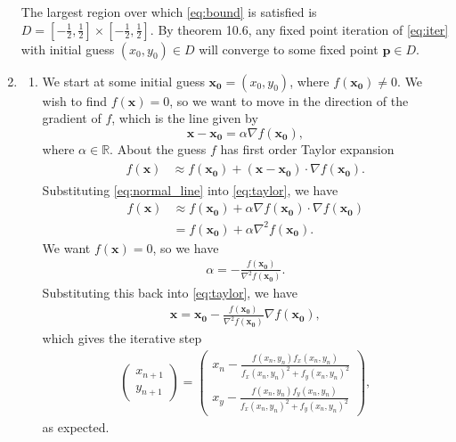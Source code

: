 \documentclass[10pt]{article}
\renewcommand{\vec}{\mathbf}
\begin{document}
\begin{enumerate}
    The largest region over which \eqref{eq:bound} is satisfied is \(D = [-\frac{1}{2}, \frac{1}{2}] \times [-\frac{1}{2}, \frac{1}{2}]\). By theorem 10.6, any fixed point iteration of \eqref{eq:iter} with initial guess \((x_0, y_0) \in D\) will converge to some fixed point \(\mathbf{p} \in D\).

    \newpage

    \item \begin{enumerate}
      \item We start at some initial guess \(\vec{x_0} = (x_0, y_0)\), where \(f(\vec{x_0}) \neq 0\). We wish to find \(f(\vec{x}) = 0\), so we want to move in the direction of the gradient of \(f\), which is the line given by \begin{equation}\label{eq:normal_line}
        \vec{x}-\vec{x_0} = \alpha \nabla f(\vec{x_0}),
      \end{equation} where \(\alpha \in \mathbb{R}\).
      About the guess \(f\) has first order Taylor expansion \begin{align}\label{eq:taylor}
        \begin{split}
          f(\vec{x}) &\approx f(\vec{x_0}) + (\vec{x}-\vec{x_0})\cdot \nabla f(\vec{x_0}).
        \end{split}
      \end{align} Substituting \eqref{eq:normal_line} into \eqref{eq:taylor}, we have \begin{align*}
          f(\vec{x}) &\approx f(\vec{x_0}) + \alpha \nabla f(\vec{x_0}) \cdot  \nabla f(\vec{x_0}) \\
          &= f(\vec{x_0}) + \alpha \nabla^2 f(\vec{x_0}).
      \end{align*} We want \(f(\vec{x}) = 0\), so we have \begin{align*}
          \alpha = -\frac{f(\vec{x_0})}{\nabla^2 f(\vec{x_0})}.
      \end{align*} Substituting this back into \eqref{eq:taylor}, we have \begin{align*}
          \vec{x} = \vec{x_0} - \frac{f(\vec{x_0})}{\nabla^2 f(\vec{x_0})}\nabla f(\vec{x_0}),
      \end{align*} which gives the iterative step \begin{align*}
          \begin{pmatrix}
            x_{n+1} \\ y_{n+1}
          \end{pmatrix} = \begin{pmatrix}
            x_n - \frac{f(x_n, y_n) f_x(x_n, y_n)}{f_x(x_n, y_n)^2 + f_y(x_n, y_n)^2} \\
            x_y - \frac{f(x_n, y_n) f_y(x_n, y_n)}{f_x(x_n, y_n)^2 + f_y(x_n, y_n)^2}
          \end{pmatrix},
      \end{align*} as expected.
    \end{enumerate}


\end{enumerate}
\end{document}
